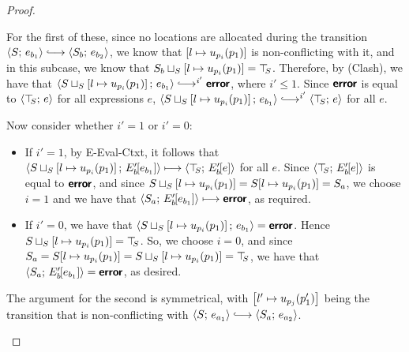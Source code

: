 \begin{proof}
\begin{enumerate}
\begin{enumerate}
\begin{itemize}
        For the first of these, since no locations are allocated
        during the transition $\config{S}{e_{b_1}} \parstepsto
        \config{S_b}{e_{b_2}}$, we know that
        $\left[ l \mapsto u_{p_i}(p_1) \right]$ is
        non-conflicting with it, and in this subcase, we know that
        $S_b \sqcup_{S} \left[ l \mapsto u_{p_i}(p_1) \right]
        = \top\hspace{-0.85mm}_{S}$.  Therefore, by (Clash),
        we have that
        $\config{\lubstore{S}{\store{\storebindingRaw{l}{u_{p_i}(p_1)}}}}{e_{b_1}}
        \parstepsto^{i'} \error$, where $i' \leq 1$.  Since $\textbf{\textsf{error}}$ is
        equal to $\langle \top\hspace{-0.85mm}_{S};\, e \rangle$ for all expressions $e$,
        $\config{\lubstore{S}{\store{\storebindingRaw{l}{u_{p_i}(p_1)}}}}{e_{b_1}}
        \parstepsto^{i'} \config{\topS}{e}$ for all $e$.

        Now consider whether $i' = 1$ or $i' = 0$:
        \begin{itemize}
          \item If $i' = 1$, by {\sc E-Eval-Ctxt}, it follows that
            $\langle S \sqcup_{S} \left[ l \mapsto u_{p_i}(p_1) \right];\, E'_b\hspace{-1mm}\left[e_{b_1}\right] \rangle
            \longmapsto \langle \top\hspace{-0.85mm}_{S};\, E'_b\hspace{-1mm}\left[e\right] \rangle$ for all
            $e$.  Since $\langle \top\hspace{-0.85mm}_{S};\, E'_b\hspace{-1mm}\left[e\right] \rangle$ is equal
            to $\textbf{\textsf{error}}$, and since
            $S \sqcup_{S} \left[ l \mapsto u_{p_i}(p_1) \right]
            = S[l \mapsto u_{p_i}(p_1)] = S_a$, we choose $i
            = 1$ and we have that
            $\langle S_a;\, E'_b\hspace{-1mm}\left[e_{b_1}\right] \rangle \longmapsto
            \textbf{\textsf{error}}$, as required.

          \item If $i' = 0$, we have that
            $\langle S \sqcup_{S} \left[ l \mapsto u_{p_i}(p_1) \right];\, e_{b_1} \rangle
            = \textbf{\textsf{error}}$.  Hence
            $S \sqcup_{S} \left[ l \mapsto u_{p_i}(p_1) \right]
            = \top\hspace{-0.85mm}_{S}$.  So, we choose $i = 0$, and since $S_a =
            S[l \mapsto u_{p_i}(p_1)] =
            S \sqcup_{S} \left[ l \mapsto u_{p_i}(p_1) \right]
            = \top\hspace{-0.85mm}_{S}$, we have that
            $\langle S_a;\, E'_b\hspace{-1mm}\left[e_{b_1}\right] \rangle = \textbf{\textsf{error}}$, as
            desired.
        \end{itemize}

        The argument for the second is symmetrical, with
        $\left[ l' \mapsto u_{p_j}(p'_1) \right]$ being the
        transition that is non-conflicting with $\config{S}{e_{a_1}}
        \parstepsto \config{S_a}{e_{a_2}}$.


\end{itemize}
\end{enumerate}
\end{enumerate}
\end{proof}

